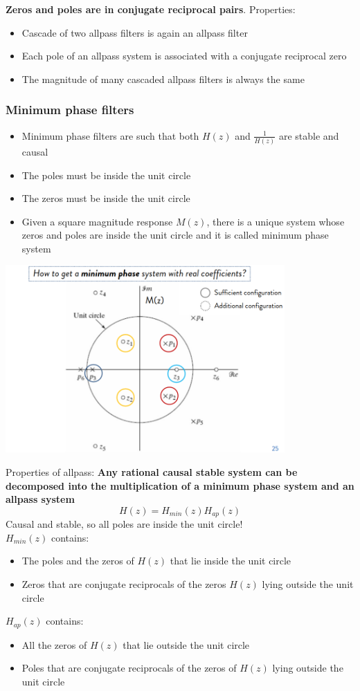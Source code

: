 \textbf{Zeros and poles are in conjugate reciprocal pairs}.
Properties:
\begin{itemize}
    \item Cascade of two allpass filters is again an allpass filter
    \item Each pole of an allpass system is associated with a conjugate reciprocal zero
    \item The magnitude of many cascaded allpass filters is always the same
\end{itemize}

\subsubsection{Minimum phase filters}
\begin{itemize}
    \item Minimum phase filters are such that both $H(z)$ and $\frac{1}{H(z)}$ are stable and causal
    \item The poles must be inside the unit circle
    \item The zeros must be inside the unit circle
    \item Given a square magnitude response $M(z)$, there is a unique system whose zeros and poles are inside the unit circle and it is called minimum phase system
\end{itemize}
\begin{center}
    \includegraphics[width=0.8\textwidth]{images/minphase.png}
\end{center}
Properties of allpass: \textbf{Any rational causal stable system can be decomposed into the multiplication of a minimum phase system and an allpass system}
$$
H(z)=H_{min}(z)H_{ap}(z)
$$
Causal and stable, so all poles are inside the unit circle!\\
$H_{min}(z)$ contains:
\begin{itemize}
    \item The poles and the zeros of $H(z)$ that lie inside the unit circle
    \item Zeros that are conjugate reciprocals of the zeros $H(z)$ lying outside the unit circle
\end{itemize}
$H_{ap}(z)$ contains:
\begin{itemize}
    \item All the zeros of $H(z)$ that lie outside the unit circle
    \item Poles that are conjugate reciprocals of the zeros of $H(z)$ lying outside the unit circle
\end{itemize}

